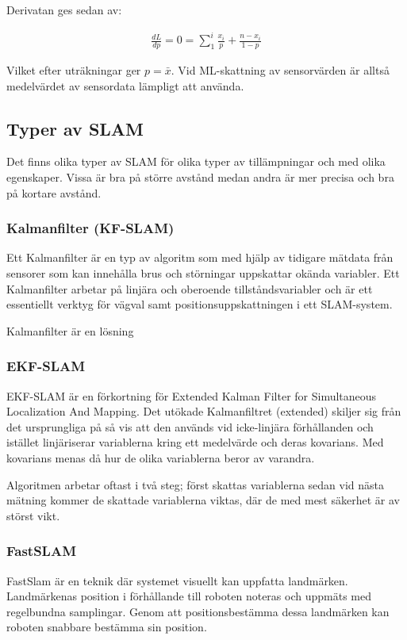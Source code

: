 \documentclass[a4paper,12pt,fleqn]{article}
\begin{document}
Derivatan ges sedan av: 

\begin{gather}
\frac{dL}{dp} = 0 = \sum\limits_1^i{\frac{x_i}{p}+\frac{n-x_i}{1-p}}
\end{gather}

Vilket efter uträkningar ger $p = \bar{x}$. Vid ML-skattning av sensorvärden är alltså medelvärdet av sensordata lämpligt att använda.



\subsection{Typer av SLAM}
Det finns olika typer av SLAM för olika typer av tillämpningar och med olika egenskaper. Vissa är bra på större avstånd medan andra är mer precisa och bra på kortare avstånd. 

\subsubsection{Kalmanfilter (KF-SLAM)}
Ett Kalmanfilter är en typ av algoritm som med hjälp av tidigare mätdata från sensorer som kan innehålla brus och störningar uppskattar okända variabler. Ett Kalmanfilter arbetar på linjära och oberoende tillståndsvariabler och är ett essentiellt verktyg för vägval samt positionsuppskattningen i ett SLAM-system. 

Kalmanfilter är en lösning

\subsubsection{EKF-SLAM} 
EKF-SLAM är en förkortning för Extended Kalman Filter for Simultaneous Localization And Mapping. Det utökade Kalmanfiltret (extended) skiljer sig från det ursprungliga på så vis att den används vid icke-linjära förhållanden och istället linjäriserar variablerna kring ett medelvärde och deras kovarians. Med kovarians menas då hur de olika variablerna beror av varandra.

Algoritmen arbetar oftast i två steg; först skattas variablerna sedan vid nästa mätning 
kommer de skattade variablerna viktas, där de med mest säkerhet är av störst vikt.

\subsubsection{FastSLAM}
FastSlam är en teknik där systemet visuellt kan uppfatta landmärken. Landmärkenas position i förhållande till roboten noteras och uppmäts med regelbundna samplingar. Genom att positionsbestämma dessa landmärken kan roboten snabbare bestämma sin position. 
\end{document}
